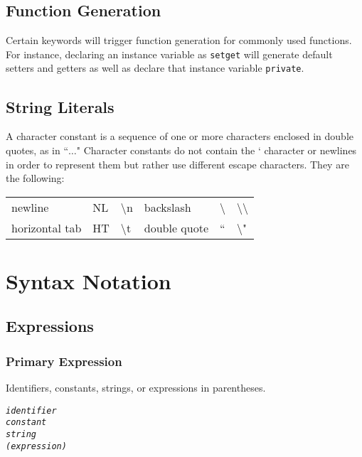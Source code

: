 \documentclass[12pt]{report}
\begin{document}
\subsection{Function Generation}

Certain keywords will trigger function generation for commonly used functions. For instance, declaring an instance variable as \texttt{setget} will generate default setters and getters as well as declare that instance variable \texttt{private}.

\subsection{String Literals}

A character constant is a sequence of one or more characters enclosed in double quotes, as in ``$\ldots$" Character constants do not contain the ` character or newlines in order to represent them but rather use different escape characters. They are the following:

\begin{flushleft}
\begin{tabular}{ l l l l l l }
newline & NL & \textbackslash{n} & backslash & \textbackslash & \textbackslash\textbackslash \\
horizontal tab & HT & \textbackslash{t} & double quote & `` & \textbackslash"
\end{tabular}
\end{flushleft}

\section{Syntax Notation}

\subsection{Expressions}

\subsubsection{Primary Expression}

Identifiers, constants, strings, or expressions in parentheses.

\begin{alltt}\begin{singlespace}
            \textit{identifier}
            \textit{constant}
            \textit{string}
            \textit{( expression )}\end{singlespace}
\end{alltt}
\end{document}
